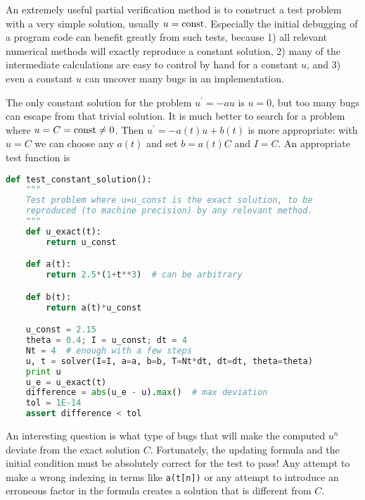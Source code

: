 \documentclass[graybox,sectrefs,envcountresetchap,open=right,final]{svmonodo}
\begin{document}
An extremely useful partial verification method is to construct a test
problem with a very simple solution, usually $u=\hbox{const}$.
Especially the initial debugging of a program code can benefit greatly
from such tests, because 1) all relevant numerical methods will
exactly reproduce a constant solution, 2) many of the intermediate
calculations are easy to control by hand for a constant $u$, and 3) even a
constant $u$ can uncover many bugs in an implementation.

The only constant solution for the problem $u^{\prime}=-au$ is $u=0$, but too
many bugs can escape from that trivial solution.  It is much better to
search for a problem where $u=C=\hbox{const}\neq 0$.  Then $u^{\prime}=-a(t)u
+ b(t)$ is more appropriate: with $u=C$ we can choose any $a(t)$ and
set $b=a(t)C$ and $I=C$. An appropriate test function is

























\begin{lstlisting}[language=python,style=blue1_bluegreen]
def test_constant_solution():
    """
    Test problem where u=u_const is the exact solution, to be
    reproduced (to machine precision) by any relevant method.
    """
    def u_exact(t):
        return u_const

    def a(t):
        return 2.5*(1+t**3)  # can be arbitrary

    def b(t):
        return a(t)*u_const

    u_const = 2.15
    theta = 0.4; I = u_const; dt = 4
    Nt = 4  # enough with a few steps
    u, t = solver(I=I, a=a, b=b, T=Nt*dt, dt=dt, theta=theta)
    print u
    u_e = u_exact(t)
    difference = abs(u_e - u).max()  # max deviation
    tol = 1E-14
    assert difference < tol

\end{lstlisting}


An interesting question is what type of bugs that will make the
computed $u^n$ deviate from the exact solution $C$.
Fortunately, the updating formula and the initial condition must
be absolutely correct for the test to pass! Any attempt to make
a wrong indexing in terms like \texttt{a(t[n])} or any attempt to
introduce an erroneous factor in the formula creates a solution
that is different from $C$.
\end{document}
